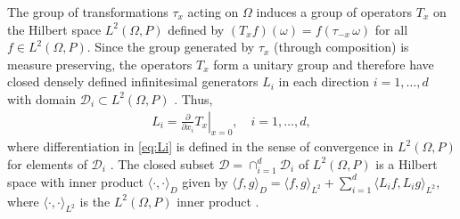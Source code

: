 \documentclass[11pt]{amsart}
\begin{document}
The group of transformations $\tau_x$ acting on $\Omega$ induces a group of
operators $T_x$ on the Hilbert space $L^2(\Omega,P)$ defined by
$(T_xf)(\omega)=f(\tau_{-x}\,\omega)$ for all $f\in L^2(\Omega,P)$. Since the group
generated by $\tau_x$ (through composition) is measure preserving, the
operators $T_x$ form a unitary group and therefore have closed densely
defined infinitesimal generators $L_i$ in each direction $i=1,\ldots,d$
with domain $\mathscr{D}_i\subset L^2(\Omega,P)$ 
\cite{Golden:CMP-473,Papanicolaou:RF-835}. Thus,  
%
\begin{align}\label{eq:Li}
  L_i=\left.\frac{\partial}{\partial x_i}T_x \right|_{x=0}, \quad i=1,\ldots,d,
\end{align}
%
where differentiation in \eqref{eq:Li} is defined in the sense of 
convergence in $L^2(\Omega,P)$ for elements of $\mathscr{D}_i$
\cite{Golden:CMP-473,Papanicolaou:RF-835}. The closed subset
$\mathscr{D}=\cap_{i=1}^d\mathscr{D}_i$ of $L^2(\Omega,P)$ is a Hilbert space
with inner product $\langle\cdot,\cdot\rangle_D$ given by $\langle f,g\rangle_D=\langle f,g\rangle_{L^2}+\sum_{i=1}^d\langle
L_if,L_ig\rangle_{L^2}$, where $\langle\cdot,\cdot\rangle_{L^2}$ is the $L^2(\Omega,P)$ inner product
\cite{Golden:CMP-473,Papanicolaou:RF-835}.
\end{document}
